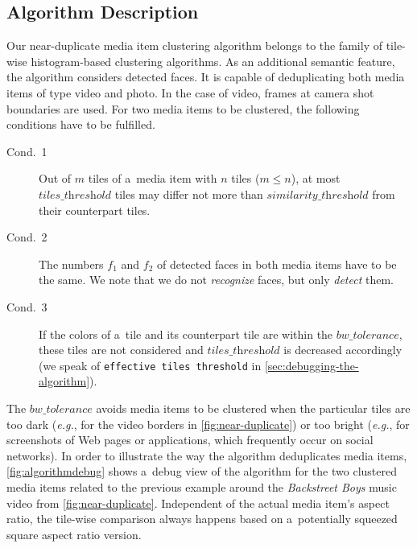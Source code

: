 \documentclass{article}
\begin{document}
\subsection{Algorithm Description}

Our near-duplicate media item clustering algorithm belongs to the family of
tile-wise histogram-based clustering algorithms.
As an additional semantic feature, the algorithm considers detected faces.
It is capable of deduplicating both media items of type video and photo.
In the case of video, frames at camera shot boundaries are used. %
For two media items to be clustered,
the following conditions have to be fulfilled.

\begin{description}
  \item[Cond.~1] Out of $m$ tiles of a~media item with $n$ tiles ($m \leq n$),
    at most $\textit{tiles\_threshold}$ tiles may differ not more than $\textit{similarity\_threshold}$
    from their counterpart tiles.
  \item[Cond.~2] The numbers $f_1$ and $f_2$ of detected faces in both media items
    have to be the same.
    We note that we do not \emph{recognize} faces, but only \emph{detect} them.
  \item[Cond.~3] If the colors of a~tile and its counterpart tile are within the
  $\textit{bw\_tolerance}$, these tiles are not considered
  and $\textit{tiles\_threshold}$ is decreased accordingly
  (we speak of \texttt{effective tiles threshold} in
  \autoref{sec:debugging-the-algorithm}).
\end{description}

The $\textit{bw\_tolerance}$ avoids media items to be clustered
when the particular tiles are too dark
(\emph{e.g.}, for the video borders in \autoref{fig:near-duplicate})
or too bright (\emph{e.g.}, for screenshots of Web pages or applications,
which frequently occur on social networks).
In order to illustrate the way the algorithm deduplicates media items,
\autoref{fig:algorithmdebug} shows a~debug view of the algorithm
for the two clustered media items related to the previous example around the
\emph{Backstreet Boys} music video from \autoref{fig:near-duplicate}.
Independent of the actual media item's aspect ratio,
the tile-wise comparison always happens based on a~potentially squeezed
square aspect ratio version.
\end{document}

